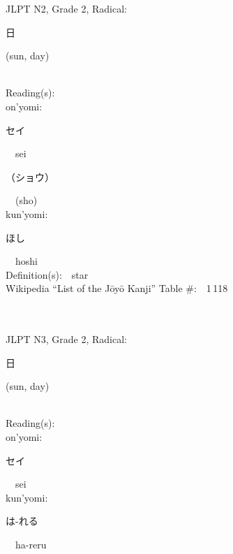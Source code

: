 \begin{multicols}{2}
{JLPT N2, Grade 2, Radical:\ \ {\begin{CJK}{UTF8}{min} 日 \end{CJK}} (sun, day) } \\
Reading(s):\ \ \\
{\hspace*{1em}}on'yomi:\ \ \\
{\hspace*{2em}}{\begin{CJK}{UTF8}{min} セイ \end{CJK}}\ \ sei\ \ \\
{\hspace*{2em}}{\begin{CJK}{UTF8}{min} （ショウ） \end{CJK}}\ \ (sho)\ \ \\
{\hspace*{1em}}kun'yomi:\ \ \\
{\hspace*{2em}}{\begin{CJK}{UTF8}{min} ほし \end{CJK}}\ \ hoshi\ \ \\
Definition(s):\ \ star \\
Wikipedia ``List of the J\=oy\=o Kanji'' Table \#:\ \ 1\,118 \\
\ \ \\
{\fontsize{34pt}{40pt}  }\ \ \\  %
{JLPT N3, Grade 2, Radical:\ \ {\begin{CJK}{UTF8}{min} 日 \end{CJK}} (sun, day) } \\
Reading(s):\ \ \\
{\hspace*{1em}}on'yomi:\ \ \\
{\hspace*{2em}}{\begin{CJK}{UTF8}{min} セイ \end{CJK}}\ \ sei\ \ \\
{\hspace*{1em}}kun'yomi:\ \ \\
{\hspace*{2em}}{\begin{CJK}{UTF8}{min} は-れる \end{CJK}}\ \ ha-reru\ \ \\

\end{multicols}
